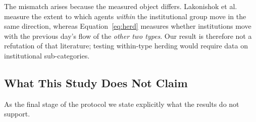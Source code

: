 The mismatch arises because the measured object differs. Lakonishok et
al.~\cite{lakonishok1992impact} measure the extent to which agents \emph{within}
the institutional group move in the same direction, whereas
Equation~\eqref{eq:herd} measures whether institutions move with the previous
day's flow of the \emph{other two types}. Our result is therefore not a
refutation of that literature; testing within-type herding would require data on
institutional sub-categories.

\subsection{What This Study Does Not Claim}
\label{sec:notclaim}

As the final stage of the protocol we state explicitly what the results do not
support.

